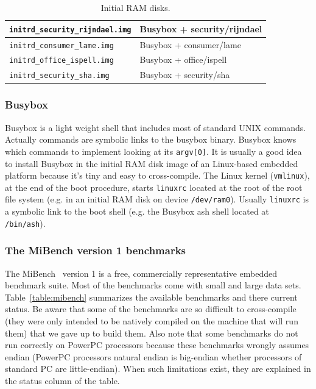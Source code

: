 \begin{table}[!h]
\begin{center}
\begin{tabular}{|l|l|}
		\hline
		\texttt{initrd\_security\_rijndael.img} & Busybox + security/rijndael\\
		\hline
		\texttt{initrd\_consumer\_lame.img} & Busybox + consumer/lame\\
		\hline
		\texttt{initrd\_office\_ispell.img} & Busybox + office/ispell\\
		\hline
		\texttt{initrd\_security\_sha.img} & Busybox + security/sha\\
		\hline
		\end{tabular}
	\end{center}
	\caption{Initial RAM disks.}
	\label{table:initrd}
\end{table}

\cleardoublepage

\subsubsection{Busybox}

Busybox is a light weight shell that includes most of standard UNIX commands. Actually commands are symbolic links to the busybox binary.
Busybox knows which commands to implement looking at its \texttt{argv[0]}.
It is usually a good idea to install Busybox in the initial RAM disk image of an Linux-based embedded platform because it's tiny and easy to cross-compile.
The Linux kernel (\texttt{vmlinux}), at the end of the boot procedure, starts \texttt{linuxrc} located at the root of the root file system (e.g. in an initial RAM disk on device \texttt{/dev/ram0}). Usually \texttt{linuxrc} is a symbolic link to the boot shell (e.g. the Busybox ash shell located at \texttt{/bin/ash}).

\subsubsection{The MiBench version 1 benchmarks}

The MiBench~\cite{mibench, mibenchwebsite} version 1 is a free, commercially representative embedded benchmark suite.
Most of the benchmarks come with small and large data sets.
Table~\ref{table:mibench} summarizes the available benchmarks and there current status.
Be aware that some of the benchmarks are so difficult to cross-compile (they were only intended to be natively compiled on the machine that will run them) that we gave up to build them.
Also note that some benchmarks do not run correctly on PowerPC processors because these benchmarks wrongly assumes endian (PowerPC processors natural endian is big-endian whether processors of standard PC are little-endian).
When such limitations exist, they are explained in the status column of the table.

